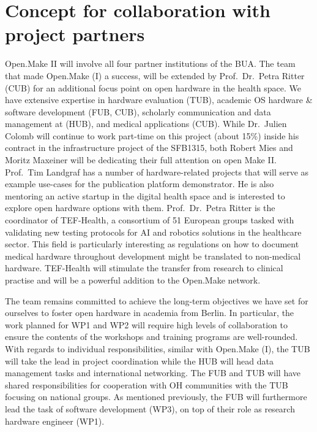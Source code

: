 \documentclass[
  12pt,
  a4paper,
]{article}
\begin{document}
\hypertarget{concept-for-collaboration-with-project-partners}{%
\section{Concept for collaboration with project
partners}\label{concept-for-collaboration-with-project-partners}}

Open.Make II will involve all four partner institutions of the BUA. The
team that made Open.Make (I) a success, will be extended by
Prof.~Dr.~Petra Ritter (CUB) for an additional focus point on open
hardware in the health space. We have extensive expertise in hardware
evaluation (TUB), academic OS hardware \& software development (FUB,
CUB), scholarly communication and data management at (HUB), and medical
applications (CUB). While Dr.~Julien Colomb will continue to work
part-time on this project (about 15\%) inside his contract in the
infrastructure project of the SFB1315, both Robert Mies and Moritz
Maxeiner will be dedicating their full attention on open Make II.
Prof.~Tim Landgraf has a number of hardware-related projects that will
serve as example use-cases for the publication platform demonstrator. He
is also mentoring an active startup in the digital health space and is
interested to explore open hardware options with them. Prof.~Dr.~Petra
Ritter is the coordinator of TEF-Health, a consortium of 51 European
groups tasked with validating new testing protocols for AI and robotics
solutions in the healthcare sector. This field is particularly
interesting as regulations on how to document medical hardware
throughout development might be translated to non-medical hardware.
TEF-Health will stimulate the transfer from research to clinical
practise and will be a powerful addition to the Open.Make network.

The team remains committed to achieve the long-term objectives we have
set for ourselves to foster open hardware in academia from Berlin. In
particular, the work planned for WP1 and WP2 will require high levels of
collaboration to ensure the contents of the workshops and training
programs are well-rounded. With regards to individual responsibilities,
similar with Open.Make (I), the TUB will take the lead in project
coordination while the HUB will head data management tasks and
international networking. The FUB and TUB will have shared
responsibilities for cooperation with OH communities with the TUB
focusing on national groups. As mentioned previously, the FUB will
furthermore lead the task of software development (WP3), on top of their
role as research hardware engineer (WP1).
\end{document}
